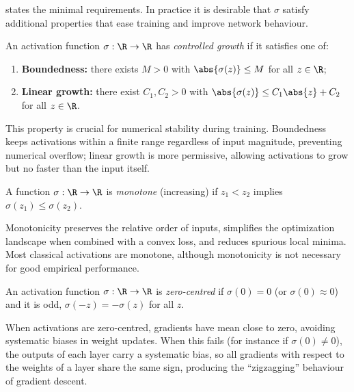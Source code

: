  states the minimal requirements. In practice it is
desirable that $\sigma$ satisfy additional properties that ease training and
improve network behaviour.

\begin{definition}
\label{def:found:bounded}
An activation function $\sigma : \R \to \R$ has \emph{controlled growth} if it
satisfies one of:
\begin{enumerate}
  \item \textbf{Boundedness:} there exists $M > 0$ with $\abs{\sigma(z)} \le M$
    for all $z \in \R$;
  \item \textbf{Linear growth:} there exist $C_1, C_2 > 0$ with
    $\abs{\sigma(z)} \le C_1\abs{z} + C_2$ for all $z \in \R$.
\end{enumerate}
\end{definition}

This property is crucial for numerical stability during training. Boundedness
keeps activations within a finite range regardless of input magnitude,
preventing numerical overflow; linear growth is more permissive, allowing
activations to grow but no faster than the input itself.

\begin{definition}[Monotonicity]
\label{def:found:monotone}
A function $\sigma : \R \to \R$ is \emph{monotone} (increasing) if
$z_1 < z_2$ implies $\sigma(z_1) \le \sigma(z_2)$.
\end{definition}

Monotonicity preserves the relative order of inputs, simplifies the optimization
landscape when combined with a convex loss, and reduces spurious local minima.
Most classical activations are monotone, although monotonicity is not necessary
for good empirical performance.

\begin{definition}
\label{def:found:zerocentered}
An activation function $\sigma : \R \to \R$ is \emph{zero-centred} if
$\sigma(0) = 0$ (or $\sigma(0) \approx 0$) and it is odd,
$\sigma(-z) = -\sigma(z)$ for all $z$.
\end{definition}

When activations are zero-centred, gradients have mean close to zero, avoiding
systematic biases in weight updates. When this fails (for instance if
$\sigma(0) \ne 0$), the outputs of each layer carry a systematic bias, so all
gradients with respect to the weights of a layer share the same sign, producing
the ``zigzagging'' behaviour of gradient descent.

